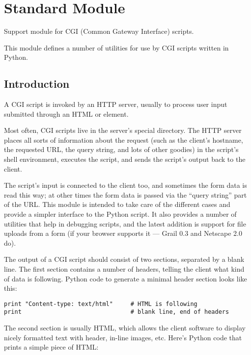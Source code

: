 \section{Standard Module }
\label{module-cgi}


Support module for CGI (Common Gateway Interface) scripts.%

This module defines a number of utilities for use by CGI scripts
written in Python.

\subsection{Introduction}

A CGI script is invoked by an HTTP server, usually to process user
input submitted through an HTML  or  element.

Most often, CGI scripts live in the server's special 
directory.  The HTTP server places all sorts of information about the
request (such as the client's hostname, the requested URL, the query
string, and lots of other goodies) in the script's shell environment,
executes the script, and sends the script's output back to the client.

The script's input is connected to the client too, and sometimes the
form data is read this way; at other times the form data is passed via
the ``query string'' part of the URL.  This module is intended
to take care of the different cases and provide a simpler interface to
the Python script.  It also provides a number of utilities that help
in debugging scripts, and the latest addition is support for file
uploads from a form (if your browser supports it --- Grail 0.3 and
Netscape 2.0 do).

The output of a CGI script should consist of two sections, separated
by a blank line.  The first section contains a number of headers,
telling the client what kind of data is following.  Python code to
generate a minimal header section looks like this:

\begin{verbatim}
print "Content-type: text/html"     # HTML is following
print                               # blank line, end of headers
\end{verbatim}

The second section is usually HTML, which allows the client software
to display nicely formatted text with header, in-line images, etc.
Here's Python code that prints a simple piece of HTML:

